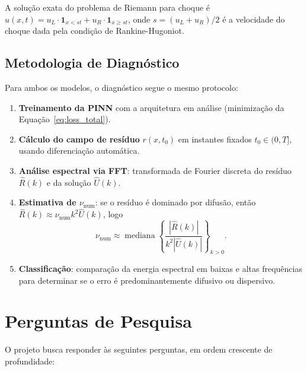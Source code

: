 \documentclass[12pt, a4paper]{article}
\theoremstyle{definition}
\begin{document}
A solução exata do problema de Riemann para choque é
$u(x,t) = u_L \cdot \mathbf{1}_{x < s t} + u_R \cdot \mathbf{1}_{x \geq st}$,
onde $s = (u_L + u_R)/2$ é a velocidade do choque dada pela condição de
Rankine-Hugoniot.

\subsection{Metodologia de Diagnóstico}

Para ambos os modelos, o diagnóstico segue o mesmo protocolo:

\begin{enumerate}
    \item \textbf{Treinamento da PINN} com a arquitetura em análise (minimização
    da Equação~\ref{eq:loss_total}).

    \item \textbf{Cálculo do campo de resíduo} $r(x, t_0)$ em instantes fixados
    $t_0 \in (0, T]$, usando diferenciação automática.

    \item \textbf{Análise espectral via FFT}: transformada de Fourier discreta do
    resíduo $\hat{R}(k)$ e da solução $\hat{U}(k)$.

    \item \textbf{Estimativa de $\nu_{\mathrm{num}}$}: se o resíduo é dominado por
    difusão, então $\hat{R}(k) \approx \nu_{\mathrm{num}} k^2 \hat{U}(k)$, logo
    \begin{equation}
        \nu_{\mathrm{num}} \approx \operatorname{mediana}
        \left\{\frac{|\hat{R}(k)|}{k^2 |\hat{U}(k)|}\right\}_{k > 0}.
        \label{eq:nu_num}
    \end{equation}

    \item \textbf{Classificação}: comparação da energia espectral em baixas e altas
    frequências para determinar se o erro é predominantemente difusivo ou dispersivo.
\end{enumerate}

\section{Perguntas de Pesquisa}

O projeto busca responder às seguintes perguntas, em ordem crescente de profundidade:
\end{document}
